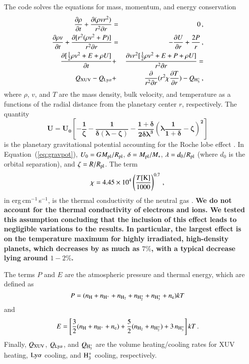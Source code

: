 \documentclass{aa}
\def\hhh{{\rm H_3^+}}
\begin{document}
The code solves the equations for mass, momentum, and energy conservation
%
\begin{eqnarray}
\frac{\partial\rho}{\partial t} + \frac{\partial(\rho v r^2)}{r^2\partial r} &=& 0\,, \\
\frac{\partial\rho v}{\partial t} + \frac{\partial[r^2(\rho v^2+P)]}{r^2\partial r} &=& - \frac{\partial U}{\partial r} + \frac{2P}{r}\,, \\
\frac{\partial[\frac{1}{2}\rho v^2+E+\rho U]}{\partial t} &+& \frac{\partial vr^2[\frac{1}{2}\rho v^2+E+P+\rho U]}{r^2\partial r} = \nonumber\\
Q_{\rm XUV} - Q_{\rm Ly\alpha} &+& \frac{\partial}{r^2\partial r}(r^2\chi \frac{\partial T}{\partial r}) - Q_{\rm H_3^+}\,,
\end{eqnarray}
%
where $\rho$, $v$, and $T$ are the mass density, bulk velocity, and temperature as a functions of the radial distance from the planetary center $r$, respectively. The quantity
%
\begin{equation}
\label{eq:gravpot} \mathbf{U = U_0\left[-\frac{1}{\zeta}-\frac{1}{\delta(\lambda-\zeta)}-\frac{1+\delta}{2\delta\lambda^3}\left(\lambda\frac{1}{1+\delta}-\zeta\right)^2\right]}
\end{equation}
%
is the planetary gravitational potential accounting for the Roche lobe effect \citep{erkaev2007}. In Equation~(\ref{eq:gravpot}), $U_0 = GM_{\rm pl}/R_{\rm pl}$, $\delta = M_{\rm pl}/M_*$, $\lambda = d_0/R_{\rm pl}$ (where $d_0$ is the orbital separation), and $\zeta = R/R_{\rm pl}$. The term
%
\begin{equation}
\chi = 4.45\times10^4\left(\frac{T[{\rm K}]}{1000}\right)^{0.7}\,,
\end{equation}
%
in erg\,cm$^{-1}$\,s$^{-1}$, is the thermal conductivity of the
neutral gas \citep{watson1981}. {\bf We do not account for the
thermal conductivity of electrons and ions. We tested this
assumption concluding that the inclusion of this effect leads to
negligible variations to the results. In particular, the largest
effect is on the temperature maximum for highly irradiated,
high-density planets, which decreases by as much as $7\%$, with a
typical decrease lying around $1-2\%$.}

The terms $P$ and $E$ are the atmospheric pressure and thermal
energy, which are defined as
%
\begin{equation}
P = (n_{\rm H} + n_{\rm H^+} + n_{\rm H_2} + n_{\rm H_2^+} + n_{\rm H_3^+}+n_{\rm e})kT
\end{equation}
%
and
%
\begin{equation}
E = \left[\frac{3}{2}(n_{\rm H}+n_{\rm H^+}+n_{\rm e})+\frac{5}{2}(n_{\rm H_2}+n_{\rm H_2^+})+3\,n_{\rm H_3^+}\right]kT\,.
\end{equation}
%
Finally, $Q_{\rm XUV}$, $Q_{\rm Ly\alpha}$, and $Q_{\rm H_3^+}$
are the volume heating/cooling  rates for XUV heating, $\rm
Ly\alpha$ cooling, and $\hhh$ cooling, respectively.
\end{document}
